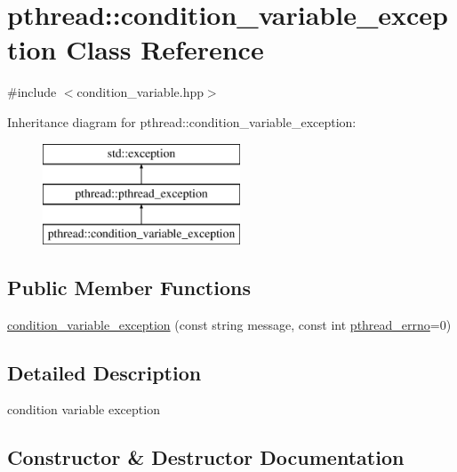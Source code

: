 \hypertarget{classpthread_1_1condition__variable__exception}{}\section{pthread\+:\+:condition\+\_\+variable\+\_\+exception Class Reference}
\label{classpthread_1_1condition__variable__exception}


{\ttfamily \#include $<$condition\+\_\+variable.\+hpp$>$}

Inheritance diagram for pthread\+:\+:condition\+\_\+variable\+\_\+exception\+:\begin{figure}[H]
\begin{center}
\leavevmode
\includegraphics[height=3.000000cm]{classpthread_1_1condition__variable__exception}
\end{center}
\end{figure}
\subsection*{Public Member Functions}
\begin{DoxyCompactItemize}
\item 
\hyperlink{classpthread_1_1condition__variable__exception_a00dd4b86da3021ae39baff18c6b5e0fc}{condition\+\_\+variable\+\_\+exception} (const string message, const int \hyperlink{classpthread_1_1pthread__exception_a8a5c22a403ebd14635e912295fe02a1e}{pthread\+\_\+errno}=0)
\end{DoxyCompactItemize}


\subsection{Detailed Description}
condition variable exception 

\subsection{Constructor \& Destructor Documentation}
